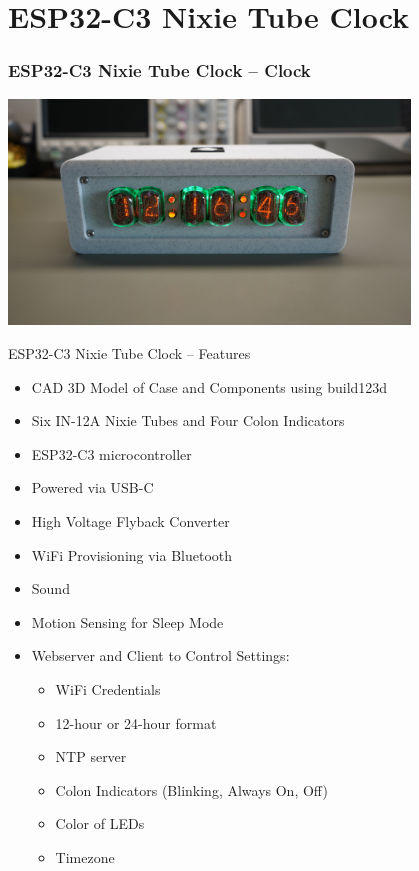 \documentclass{beamer}
\begin{document}
    \section{ESP32-C3 Nixie Tube Clock}

    \begin{frame}
        \frametitle{ESP32-C3 Nixie Tube Clock -- Clock}

        \centering
        \includegraphics[width=0.8\textwidth]{clock.jpeg}
    \end{frame}

    \begin{frame}{ESP32-C3 Nixie Tube Clock -- Features}
        \footnotesize
        \begin{itemize}
            \item CAD 3D Model of Case and Components using build123d
            \item Six IN-12A Nixie Tubes and Four Colon Indicators
            \item ESP32-C3 microcontroller
            \item Powered via USB-C
            \item High Voltage Flyback Converter
            \item WiFi Provisioning via Bluetooth
            \item Sound
            \item Motion Sensing for Sleep Mode
            \item Webserver and Client to Control Settings:
            \begin{itemize}
                \item WiFi Credentials
                \item 12-hour or 24-hour format
                \item NTP server
                \item Colon Indicators (Blinking, Always On, Off)
                \item Color of LEDs
                \item Timezone
            \end{itemize}
        \end{itemize}
    \end{frame}
\end{document}

